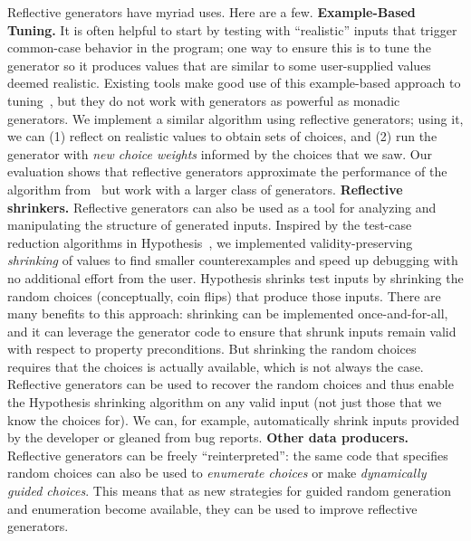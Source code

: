Reflective generators have myriad uses. Here are a few.
%
{\bf Example-Based Tuning.} It is often helpful to start by testing with
``realistic'' inputs that trigger common-case behavior in the program;
one way to ensure this is to tune the generator so
it produces values that are similar to some user-supplied values deemed
realistic. Existing tools make good use of this example-based approach to
tuning~\cite{soremekun2020inputs}, but they do not work with generators as
powerful as monadic generators. We implement a similar algorithm using
reflective generators; using it, we can (1) reflect on realistic values to
obtain sets of choices, and (2) run the generator with {\em new choice weights}
informed by the choices that we saw. Our evaluation shows that reflective
generators approximate the performance of the algorithm
from~\cite{soremekun2020inputs} but work with a larger class of generators.
%
{\bf Reflective shrinkers.}
Reflective generators can also be used as a tool for analyzing and
manipulating the structure of generated inputs. Inspired by the test-case
reduction algorithms in Hypothesis~\cite{maciver_test-case_2020}, we implemented
validity-preserving {\em shrinking} of values to find smaller counterexamples
and speed up debugging with no additional effort from the user.
%
Hypothesis shrinks test inputs by shrinking the random choices (conceptually, coin flips)
that produce those
inputs. There are many benefits to this approach: shrinking can be implemented
once-and-for-all, and it can leverage the generator code to ensure that shrunk
inputs remain valid with respect to property preconditions.  But shrinking the
random choices requires that the choices is actually available, which
is not always the case. Reflective generators
can be used to
recover the random choices and thus enable the Hypothesis shrinking algorithm on any
valid input (not just those that we know the choices for). We can, for
example, automatically shrink inputs provided by the developer or
gleaned from bug reports.
%
{\bf Other data producers.} Reflective generators can be freely
``reinterpreted'': the same code that specifies random choices can
also be used to {\em enumerate choices} or make {\em dynamically guided choices}.
This means that as new strategies for guided random generation and
enumeration become available, they can be used to improve reflective
generators.

